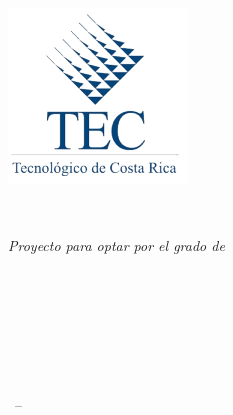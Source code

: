 
\begin{titlepage}

\begin{addmargin}[-1cm]{-3cm}
\begin{center}
\large

\hfill
\vfill

\begingroup
\color{Maroon}\spacedallcaps{\myTitle} \\ \bigskip %
\endgroup

\spacedlowsmallcaps{\myName} %

\vfill

\includegraphics{gfx/logo} \\ \medskip %

\mySubtitle \\ \bigskip \bigskip

\textit{Proyecto para optar por el grado de }\\
\textit{\myDegree} \\ \bigskip \bigskip

\myDepartment \\
\myFaculty\\ 
\myUni \\ \bigskip

\begingroup
\color{tecblue} \textbullet \\ \bigskip
\endgroup

\myTime\ -- \myVersion %

\vfill

\end{center}
\end{addmargin}

\end{titlepage}